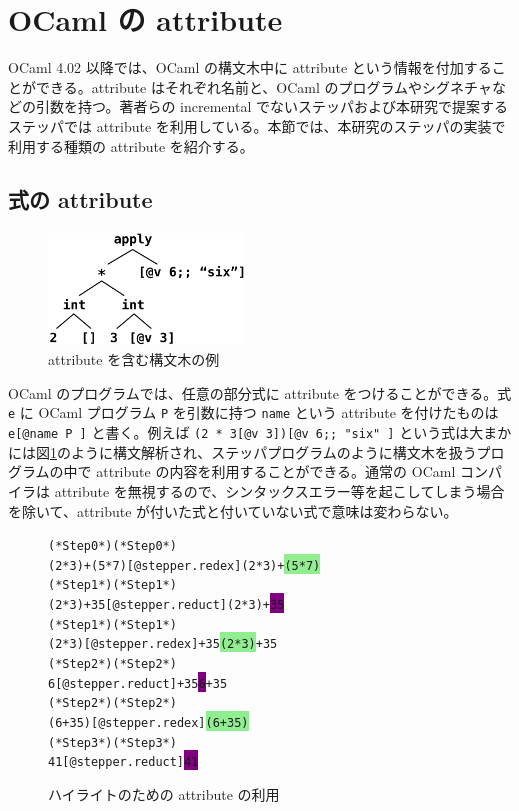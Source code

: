 \section{OCaml の attribute}
\label{OCamlのattribute}
OCaml 4.02 以降では、OCaml の構文木中に attribute という情報を付加することができる。attribute はそれぞれ名前と、OCaml のプログラムやシグネチャなどの引数を持つ。著者らの incremental でないステッパ\cite{FCA19}および本研究で提案するステッパでは attribute を利用している。本節では、本研究のステッパの実装で利用する種類の attribute を紹介する。

\subsection{式の attribute}
\label{OCamlのattribute-式のattribute}

\begin{figure}
  \begin{center}
    \includegraphics[width=5.2cm, height=3cm]{5/attribute.png}
  \end{center}
  \caption{attribute を含む構文木の例}
  \label{figure:attribute}
\end{figure}

OCaml のプログラムでは、任意の部分式に attribute をつけることができる。式 \texttt{e} に OCaml プログラム \texttt{P} を引数に持つ \texttt{name} という attribute を付けたものは \texttt{e[@name P ]} と書く。例えば \texttt{(2 * 3[@v 3])[@v 6;; "six" ]} という式は大まかには図\ref{figure:attribute}のように構文解析され、ステッパプログラムのように構文木を扱うプログラムの中で attribute の内容を利用することができる。通常の OCaml コンパイラは attribute を無視するので、シンタックスエラー等を起こしてしまう場合を除いて、attribute が付いた式と付いていない式で意味は変わらない。

\begin{figure}
\begin{alltt}
  (* Step 0 *)                              (* Step 0 *)
  (2 * 3) + (5 * 7)[@stepper.redex ]        (2 * 3) + \colorbox{lightgreen}{(5 * 7)}
  (* Step 1 *)                              (* Step 1 *)
  (2 * 3) + 35[@stepper.reduct ]            (2 * 3) + \colorbox{purple}{35}
  (* Step 1 *)                              (* Step 1 *)
  (2 * 3)[@stepper.redex ] + 35             \colorbox{lightgreen}{(2 * 3)} + 35
  (* Step 2 *)                              (* Step 2 *)
  6[@stepper.reduct ] + 35                  \colorbox{purple}{6} + 35
  (* Step 2 *)                              (* Step 2 *)
  (6 + 35)[@stepper.redex ]                 \colorbox{lightgreen}{(6 + 35)}
  (* Step 3 *)                              (* Step 3 *)
  41[@stepper.reduct ]                      \colorbox{purple}{41}
\end{alltt}
\caption{ハイライトのための attribute の利用}
\label{figure:highlight}
\end{figure}

